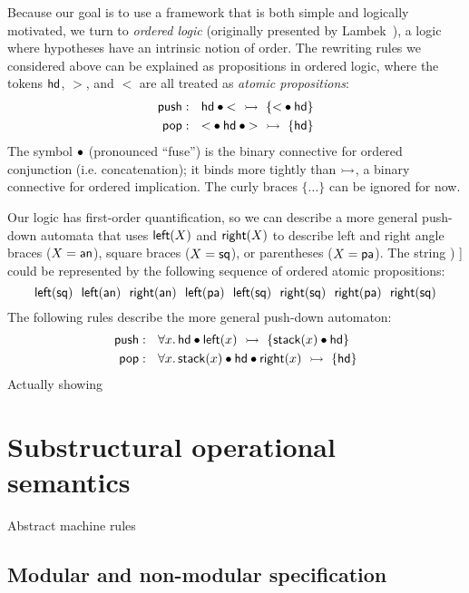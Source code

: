 Because our goal is to use a framework that is both simple and
logically motivated, we turn to {\it ordered logic} (originally
presented by Lambek~\cite{lambek58mathematics}), a logic where
hypotheses have an intrinsic notion of order. The rewriting rules
we considered above can be explained as propositions in ordered
logic, where the tokens ${\sf hd}$, $>$, and $<$ are all treated as
{\it atomic propositions}:
\begin{align*}
{\sf push} &: ~~ {\sf hd} \mathbin{\bullet} {<} ~\rightarrowtail~ \{ {<} \mathbin{\bullet} {\sf hd} \}
\\ 
{\sf pop} &: ~~ {<} \mathbin{\bullet} {\sf hd} \mathbin{\bullet} {>} ~\rightarrowtail~ \{ {\sf hd} \}
\end{align*}
The symbol $\mathbin{\bullet}$ (pronounced ``fuse'') is the binary connective for
ordered conjunction (i.e. concatenation); it binds more tightly than
$\rightarrowtail$, a binary connective for ordered implication. The curly
braces $\{ \ldots \}$ can be ignored for now.

Our logic has first-order quantification, so we can describe a more
general push-down automata that uses ${\sf left}(X)$ and ${\sf
  right}(X)$ to describe left and right angle braces ($X = {\sf an}$),
square braces ($X = {\sf sq}$), or parentheses ($X = {\sf pa}$). The
string {\sf [ \textless~\textgreater~( [ ] ) ]} could be represented by the following
sequence of ordered atomic propositions:
\[
{\sf 
  left(sq) ~~
  left(an) ~~
  right(an) ~~
  left(pa) ~~
  left(sq) ~~
  right(sq) ~~
  right(pa) ~~
  right(sq)
}
\]
The following rules describe the more general push-down automaton:
\begin{align*}
{\sf push} &: ~~ \forall x.\, 
  {\sf hd} \mathbin{\bullet} {\sf left}(x) ~\rightarrowtail~ \{ {\sf stack}(x) \mathbin{\bullet} {\sf hd} \}
\\ 
{\sf pop} &: ~~ \forall x.\, 
  {\sf stack}(x) \mathbin{\bullet} {\sf hd} \mathbin{\bullet} {\sf right}(x) ~\rightarrowtail~ \{ {\sf hd} \}
\end{align*}
Actually showing

\section{Substructural operational semantics}
\label{sec:intro-ssos}

Abstract machine rules

\subsection{Modular and non-modular specification}
\label{sec:modularnonmodular}

